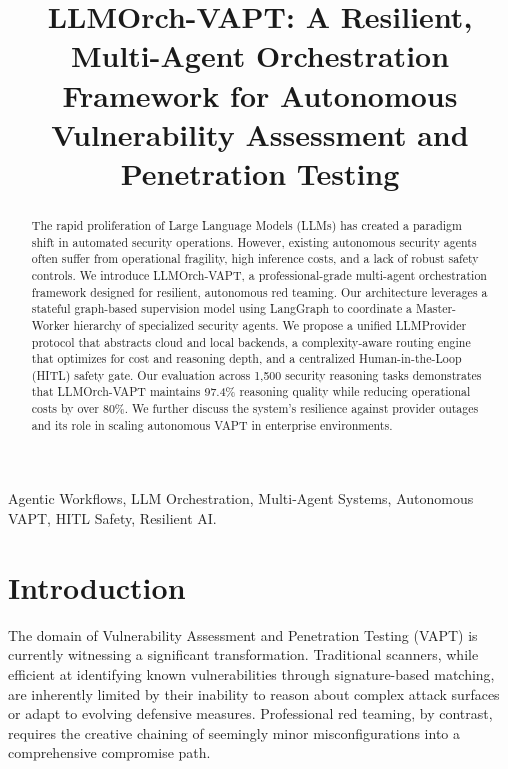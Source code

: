 \documentclass[conference,compsoc]{IEEEtran}
\begin{document}
\title{LLMOrch-VAPT: A Resilient, Multi-Agent Orchestration Framework for Autonomous Vulnerability Assessment and Penetration Testing}

\author{
}

\maketitle

\begin{abstract}
The rapid proliferation of Large Language Models (LLMs) has created a paradigm shift in automated security operations. However, existing autonomous security agents often suffer from operational fragility, high inference costs, and a lack of robust safety controls. We introduce LLMOrch-VAPT, a professional-grade multi-agent orchestration framework designed for resilient, autonomous red teaming. Our architecture leverages a stateful graph-based supervision model using LangGraph to coordinate a Master-Worker hierarchy of specialized security agents. We propose a unified LLMProvider protocol that abstracts cloud and local backends, a complexity-aware routing engine that optimizes for cost and reasoning depth, and a centralized Human-in-the-Loop (HITL) safety gate. Our evaluation across 1,500 security reasoning tasks demonstrates that LLMOrch-VAPT maintains 97.4\% reasoning quality while reducing operational costs by over 80\%. We further discuss the system's resilience against provider outages and its role in scaling autonomous VAPT in enterprise environments.
\end{abstract}

\begin{IEEEkeywords}
Agentic Workflows, LLM Orchestration, Multi-Agent Systems, Autonomous VAPT, HITL Safety, Resilient AI.
\end{IEEEkeywords}

\section{Introduction}
The domain of Vulnerability Assessment and Penetration Testing (VAPT) is currently witnessing a significant transformation. Traditional scanners, while efficient at identifying known vulnerabilities through signature-based matching, are inherently limited by their inability to reason about complex attack surfaces or adapt to evolving defensive measures. Professional red teaming, by contrast, requires the creative chaining of seemingly minor misconfigurations into a comprehensive compromise path.
\end{document}

